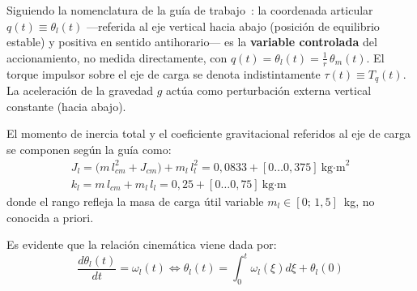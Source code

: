 \documentclass[12pt, a4paper,journal, onecolumn, compsoc]{IEEEtran}
\begin{document}
Siguiendo la nomenclatura de la guía de trabajo~\cite{guia_trabajo}: la coordenada articular $q(t) \equiv \theta_l(t)$ ---referida al eje vertical hacia abajo (posición de equilibrio estable) y positiva en sentido antihorario--- es la \textbf{variable controlada} del accionamiento, no medida directamente, con $q(t)=\theta_l(t)=\frac{1}{r}\,\theta_m(t)$. El torque impulsor sobre el eje de carga se denota indistintamente $\tau(t) \equiv T_q(t)$. La aceleración de la gravedad $g$ actúa como perturbación externa vertical constante (hacia abajo).

El momento de inercia total y el coeficiente gravitacional referidos al eje de carga se componen según la guía como:
\begin{gather}
    J_l = \big(m\,l_{cm}^2 + J_{cm}\big) + m_l\,l_l^2 = 0{,}0833 + [0\ldots 0{,}375]\ \text{kg·m}^2 \\
    k_l = m\,l_{cm} + m_l\,l_l = 0{,}25 + [0\ldots 0{,}75]\ \text{kg·m}
\end{gather}
donde el rango refleja la masa de carga útil variable $m_l \in [0;\,1{,}5]$~kg, no conocida a priori.

Es evidente que la relación cinemática viene dada por:
\[
    \frac{d\theta_l(t)}{dt} = \omega_l(t) \Leftrightarrow \theta_l(t) = \int_0^t{\omega_l(\xi)d\xi + \theta_l(0)}
\]
\end{document}
